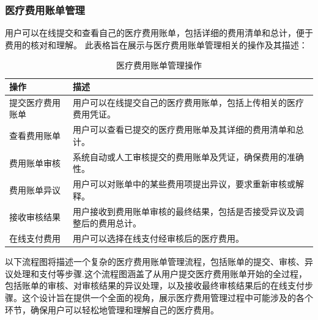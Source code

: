 \subsubsection{医疗费用账单管理}
用户可以在线提交和查看自己的医疗费用账单，包括详细的费用清单和总计，便于费用的核对和理解。
此表格旨在展示与医疗费用账单管理相关的操作及其描述：
\begin{table}[htbp]
	\centering
	\begin{tabular}{|p{6cm}|p{6cm}|}
		\hline
		\textbf{操作} & \textbf{描述} \\
		\hline
		提交医疗费用账单 & 用户可以在线提交自己的医疗费用账单，包括上传相关的医疗费用凭证。 \\
		查看费用账单 & 用户可以查看已提交的医疗费用账单及其详细的费用清单和总计。 \\
		费用账单审核 & 系统自动或人工审核提交的费用账单及凭证，确保费用的准确性。 \\
		费用账单异议 & 用户可以对账单中的某些费用项提出异议，要求重新审核或解释。 \\
		接收审核结果 & 用户接收到费用账单审核的最终结果，包括是否接受异议及调整后的费用总计。 \\
		在线支付费用 & 用户可以选择在线支付经审核后的医疗费用。 \\
		\hline
	\end{tabular}
	\caption{医疗费用账单管理操作}
\end{table}
以下流程图将描述一个复杂的医疗费用账单管理流程，包括账单的提交、审核、异议处理和支付等步骤.这个流程图涵盖了从用户提交医疗费用账单开始的全过程，包括账单的审核、对审核结果的异议处理，以及接收最终审核结果后的在线支付步骤。这个设计旨在提供一个全面的视角，展示医疗费用管理过程中可能涉及的各个环节，确保用户可以轻松地管理和理解自己的医疗费用。
